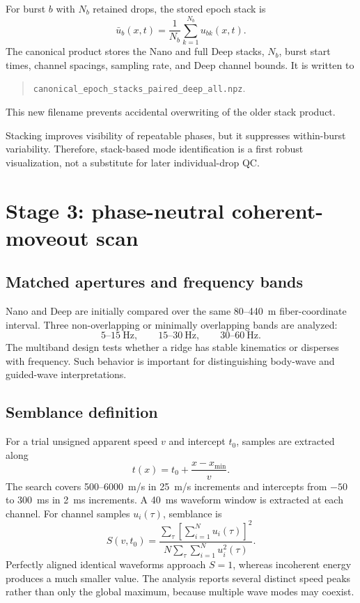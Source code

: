 \documentclass[11pt]{article}
\newcommand{\code}[1]{\texttt{#1}}
\begin{document}
For burst $b$ with $N_b$ retained drops, the stored epoch stack is
\begin{equation}
\bar{u}_b(x,t)=\frac{1}{N_b}\sum_{k=1}^{N_b}u_{bk}(x,t).
\end{equation}
The canonical product stores the Nano and full Deep stacks, $N_b$, burst start
times, channel spacings, sampling rate, and Deep channel bounds.  It is written
to
\begin{quote}
\code{canonical\_epoch\_stacks\_paired\_deep\_all.npz}.
\end{quote}
This new filename prevents accidental overwriting of the older stack product.

Stacking improves visibility of repeatable phases, but it suppresses
within-burst variability.  Therefore, stack-based mode identification is a
first robust visualization, not a substitute for later individual-drop QC.

\section{Stage 3: phase-neutral coherent-moveout scan}

\subsection{Matched apertures and frequency bands}

Nano and Deep are initially compared over the same 80--440~m fiber-coordinate
interval.  Three non-overlapping or minimally overlapping bands are analyzed:
\[
5\text{--}15~\mathrm{Hz},\qquad
15\text{--}30~\mathrm{Hz},\qquad
30\text{--}60~\mathrm{Hz}.
\]
The multiband design tests whether a ridge has stable kinematics or disperses
with frequency.  Such behavior is important for distinguishing body-wave and
guided-wave interpretations.

\subsection{Semblance definition}

For a trial unsigned apparent speed $v$ and intercept $t_0$, samples are
extracted along
\begin{equation}
t(x)=t_0+\frac{x-x_{\min}}{v}.
\end{equation}
The search covers 500--6000~m/s in 25~m/s increments and intercepts from
$-50$ to 300~ms in 2~ms increments.  A 40~ms waveform window is extracted at
each channel.  For channel samples $u_i(\tau)$, semblance is
\begin{equation}
S(v,t_0)=
\frac{\displaystyle\sum_{\tau}
      \left[\sum_{i=1}^{N}u_i(\tau)\right]^2}
     {\displaystyle N\sum_{\tau}\sum_{i=1}^{N}u_i^2(\tau)}.
\end{equation}
Perfectly aligned identical waveforms approach $S=1$, whereas incoherent
energy produces a much smaller value.  The analysis reports several distinct
speed peaks rather than only the global maximum, because multiple wave modes
may coexist.
\end{document}
